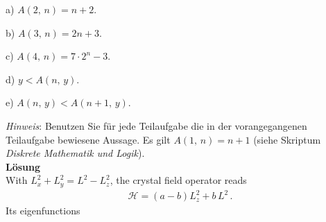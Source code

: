 \documentclass[]{article}
\begin{document}
\begin{list}{}{}
\item[a)]
$A(2,\,n)=n+2$.
\item[b)]
$A(3,\,n)=2n+3$.
\item[c)]
$A(4,\,n)=7\cdot2^n-3$.
\item[d)]
$y<A(n,\,y)$.
\item[e)]
$A(n,\,y)<A(n+1,\,y)$.
\end{list}
\textit{Hinweis}: Benutzen Sie für jede Teilaufgabe die in der vorangegangenen Teilaufgabe bewiesene Aussage. Es gilt $A(1,\,n)=n+1$ (siehe Skriptum \textit{Diskrete Mathematik und Logik}).\\[+0.5cm]
{\bf Lösung}\\[+0.3cm]
With $L_x^2+L_y^2=L^2-L_z^2$, the crystal field operator reads
\begin{eqnarray}
\mathcal{H}=(a-b)L_z^2+b\,L^2\,.\nonumber
\end{eqnarray}
Its eigenfunctions
\end{document}
